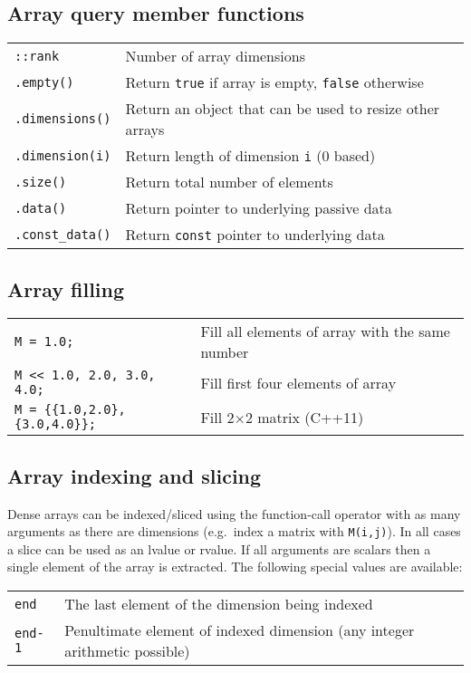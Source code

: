 \documentclass[10pt,a4,landscape]{article}
\def\code#1{\texttt{#1}}
\begin{document}
\subsection*{Array query member functions}
\begin{tabular}{ll}
\code{::rank} & Number of array dimensions\\
\code{.empty()} & Return \code{true} if array is empty, \code{false} otherwise\\
\code{.dimensions()} & Return an object that can be used to resize other arrays\\
\code{.dimension(i)} & Return length of dimension \code{i} (0 based)\\
\code{.size()} & Return total number of elements\\
\code{.data()} & Return pointer to underlying passive data\\
\code{.const\_data()} & Return \code{const} pointer to underlying data\\
\end{tabular}
\subsection*{Array filling}
\begin{tabular}{ll}
\code{M = 1.0;} & Fill all elements of array with the same number\\
\code{M <{}< 1.0, 2.0, 3.0, 4.0;} & Fill first four elements of array\\
\code{M = \{\{1.0,2.0\},\{3.0,4.0\}\};} & Fill 2$\times$2 matrix (C++11)\\
\end{tabular}
\subsection*{Array indexing and slicing}
Dense arrays can be indexed/sliced using the function-call operator
with as many arguments as there are dimensions (e.g.\ index a matrix
with \code{M(i,j)}). In all cases a slice can be used as an lvalue or
rvalue. If all arguments are scalars then a single element of the
array is extracted. The following special values are available:\\
\begin{tabular}{ll}
\code{end} & The last element of the dimension being indexed\\
\code{end-1} & Penultimate element of indexed dimension (any integer arithmetic possible)\\
\end{tabular}
\end{document}
